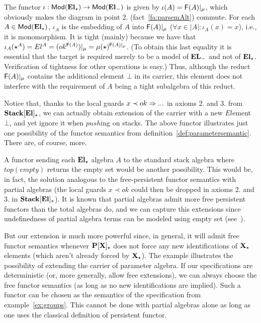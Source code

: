 \begin{example}
The functor $\iota:{\sf {Mod}}({\bf El_\star}) \to {\sf {Mod}}({\bf El_-})$ is given by
$\iota(A)= {\sf {F}}(A)|_\mu$, which obviously makes the diagram in point
2. (fact~\ref{fa:parsemAlt}) commute. For each $A\in{\sf {Mod}}({{\bf El_\star}})$, $\iota_A$ is the embedding of $A$
into ${\sf {F}}(A)|_\mu$ ($\forall x\in|A|:\iota_A(x)=x$), i.e., it is
monomorphism. It is tight (mainly) because we have that $\iota_A(\star^A) = El^A=
(ok^{{\sf {F}}(A)})|_{\mu} = \mu(\star)^{{\sf {F}}(A)|_{\mu}}$. (To obtain this last equality it is essential
that the target is required merely to be a model of ${\bf EL_-}$ and not
of ${\bf El_\star}$. Verification of tightness for other operations is easy.) Thus, although the reduct
${{\sf {F}}(A)|_{\mu}}$ contains the additional element $\bot$ in its
carrier, this element does not interfere with the requirement of $A$ being a
tight subalgebra of this reduct.
\end{example}
%
Notice that, thanks to the local guards $x\prec ok\Rightarrow...$ in axioms 2. and
3. from ${\bf Stack[El]_\star}$, we can actually obtain extension of the
carrier with a new $El$ement $\bot$, and yet ignore it when $push$ing on
stacks. 
The above functor illustrates just one possibility of the functor semantics
from definition~\ref{def:parametersemantic}. There are, of course, more.

A functor sending each
${\bf El_\star}$ algebra $A$ to the standard stack algebra where $top(empty)$
returns the empty set would be another possibility. This would be, in fact,
the solution analogous to the free-persistent functor semantics with partial
algebras (the local guards $x\prec ok$ could then be dropped in axioms 2. and
3. in ${\bf Stack[El]_\star}$). It is known that partial algebras admit more free persistent functors
than the total algebras do, and we can capture this extensions since
undefinedness of partial algebra terms can be modeled using empty set
(see~\cite{partial}). 

But our extension is much more powerful since, in general, it will
admit free functor semantics whenever ${\bf P[X]_\star}$ does not force any new
identifications of ${\bf X}_\star$ elements (which aren't already forced by
${\bf X}_\star$). The example illustrates the possibility 
of extending the carrier of parameter algebra. If our specifications are deterministic (or, more
generally, allow free extensions), we can always choose the free functor
semantics (as long as no new identifications are implied). Such a functor can be chosen as the semantics of the
specification from example~\ref{ex:groups}. This cannot be done with partial
algebras alone as long as one uses the classical definition of persistent functor.

